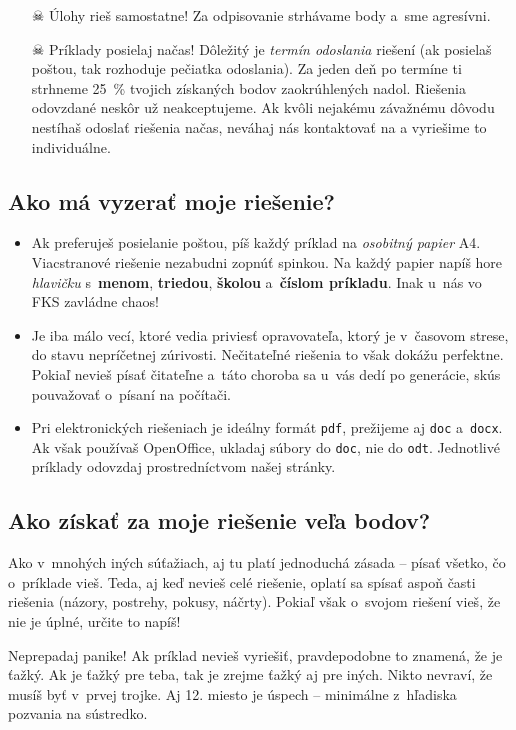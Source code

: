 \begin{itemize}
	\item[$\skull$] Úlohy rieš samostatne! Za odpisovanie strhávame body a~sme agresívni. 

	\item[$\skull$] Príklady posielaj načas! Dôležitý je \emph{termín odoslania} riešení (ak posielaš poštou, tak rozhoduje pečiatka odoslania).
		Za jeden deň po termíne ti strhneme \SI{25}{\percent} tvojich získaných bodov zaokrúhlených nadol. 
		Riešenia odovzdané neskôr už neakceptujeme. Ak kvôli nejakému závažnému dôvodu nestíhaš odoslať riešenia načas, neváhaj nás kontaktovať na \URL{\seminarEmail}
		a vyriešime to individuálne.
\end{itemize}

\subsection{Ako má vyzerať moje riešenie?}
\begin{itemize}
	\item Ak preferuješ posielanie poštou, píš každý príklad na \emph{osobitný papier} A4. Viacstranové riešenie nezabudni
		zopnúť spinkou. Na každý papier napíš hore \emph{hlavičku} s~\textbf{menom}, \textbf{triedou}, \textbf{školou} a~\textbf{číslom príkladu}.
		Inak u~nás vo FKS zavládne chaos!
	\item Je iba málo vecí, ktoré vedia priviesť opravovateľa, ktorý je v~časovom strese, do stavu nepríčetnej zúrivosti. Nečitateľné riešenia to však dokážu perfektne.
		Pokiaľ nevieš písať čitateľne a~táto choroba sa u~vás dedí po generácie, skús pouvažovať o~písaní na počítači.
	\item Pri elektronických riešeniach je ideálny formát \texttt{pdf}, prežijeme aj \texttt{doc} a~\texttt{docx}.
		Ak však používaš OpenOffice, ukladaj súbory do \texttt{doc}, nie do \texttt{odt}.
		Jednotlivé príklady odovzdaj prostredníctvom našej stránky.
\end{itemize}

\subsection{Ako získať za moje riešenie veľa bodov?}
	Ako v~mnohých iných súťažiach, aj tu platí jednoduchá zásada -- písať všetko, čo
	o~príklade vieš. Teda, aj keď nevieš celé riešenie, oplatí sa spísať aspoň časti
	riešenia (názory, postrehy, pokusy, náčrty). Pokiaľ však o~svojom riešení vieš, že
	nie je úplné, určite to napíš!

	Neprepadaj panike! Ak príklad nevieš vyriešiť, pravdepodobne to znamená, že je
	ťažký. Ak je ťažký pre teba, tak je zrejme ťažký aj pre iných. Nikto nevraví,
	že musíš byť v~prvej trojke. Aj 12. miesto je úspech -- minimálne z~hľadiska
	pozvania na sústredko.

